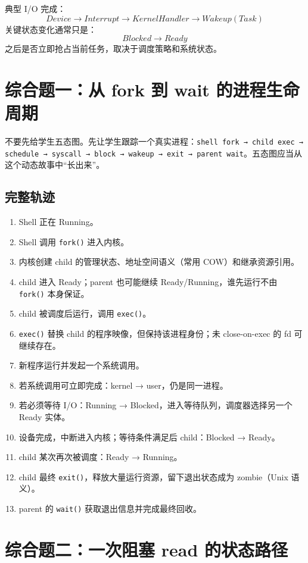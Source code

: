 \documentclass[11pt,a4paper]{ctexart}
\newcommand{\code}[1]{\texttt{#1}}
\begin{document}
典型 I/O 完成：
\[
Device\rightarrow Interrupt\rightarrow KernelHandler\rightarrow Wakeup(Task)
\]
关键状态变化通常只是：
\[
Blocked\rightarrow Ready
\]
之后是否立即抢占当前任务，取决于调度策略和系统状态。

\section{综合题一：从 fork 到 wait 的进程生命周期}

\begin{corebox}[推荐课堂主线]
不要先给学生五态图。先让学生跟踪一个真实进程：\code{shell fork → child exec → schedule → syscall → block → wakeup → exit → parent wait}。五态图应当从这个动态故事中“长出来”。
\end{corebox}

\subsection{完整轨迹}

\begin{enumerate}
\item Shell 正在 Running。
\item Shell 调用 \code{fork()} 进入内核。
\item 内核创建 child 的管理状态、地址空间语义（常用 COW）和继承资源引用。
\item child 进入 Ready；parent 也可能继续 Ready/Running，谁先运行不由 \code{fork()} 本身保证。
\item child 被调度后运行，调用 \code{exec()}。
\item \code{exec()} 替换 child 的程序映像，但保持该进程身份；未 close-on-exec 的 fd 可继续存在。
\item 新程序运行并发起一个系统调用。
\item 若系统调用可立即完成：kernel → user，仍是同一进程。
\item 若必须等待 I/O：Running → Blocked，进入等待队列，调度器选择另一个 Ready 实体。
\item 设备完成，中断进入内核；等待条件满足后 child：Blocked → Ready。
\item child 某次再次被调度：Ready → Running。
\item child 最终 \code{exit()}，释放大量运行资源，留下退出状态成为 zombie（Unix 语义）。
\item parent 的 \code{wait()} 获取退出信息并完成最终回收。
\end{enumerate}

\section{综合题二：一次阻塞 read 的状态路径}
\end{document}
